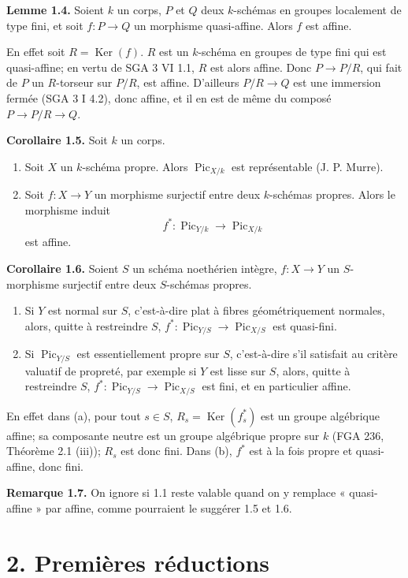 \documentclass[11pt]{article}
\providecommand{\Pic}{\operatorname{Pic}}
\providecommand{\Ker}{\operatorname{Ker}}
\begin{document}
\textbf{Lemme 1.4.} Soient \(k\) un corps, \(P\) et \(Q\) deux \(k\)-schémas en groupes localement de type fini, et soit \(f:P\to Q\) un morphisme quasi-affine. Alors \(f\) est affine.

En effet soit \(R=\Ker(f)\). \(R\) est un \(k\)-schéma en groupes de type fini qui est quasi-affine; en vertu de SGA 3 VI 1.1, \(R\) est alors affine. Donc \(P\to P/R\), qui fait de \(P\) un \(R\)-torseur sur \(P/R\), est affine. D'ailleurs \(P/R\to Q\) est une immersion fermée (SGA 3 I 4.2), donc affine, et il en est de même du composé \(P\to P/R\to Q\).

\textbf{Corollaire 1.5.} Soit \(k\) un corps.
\begin{enumerate}[label=\alph*)]
\item Soit \(X\) un \(k\)-schéma propre. Alors \(\Pic_{X/k}\) est représentable (J. P. Murre).
\item Soit \(f:X\to Y\) un morphisme surjectif entre deux \(k\)-schémas propres. Alors le morphisme induit
\[
  f^*:\Pic_{Y/k}\longrightarrow \Pic_{X/k}
\]
est affine.
\end{enumerate}

\textbf{Corollaire 1.6.} Soient \(S\) un schéma noethérien intègre, \(f:X\to Y\) un \(S\)-morphisme surjectif entre deux \(S\)-schémas propres.
\begin{enumerate}[label=\alph*)]
\item Si \(Y\) est normal sur \(S\), c'est-à-dire plat à fibres géométriquement normales, alors, quitte à restreindre \(S\), \(f^*:\Pic_{Y/S}\to\Pic_{X/S}\) est quasi-fini.
\item Si \(\Pic_{Y/S}\) est essentiellement propre sur \(S\), c'est-à-dire s'il satisfait au critère valuatif de propreté, par exemple si \(Y\) est lisse sur \(S\), alors, quitte à restreindre \(S\), \(f^*:\Pic_{Y/S}\to\Pic_{X/S}\) est fini, et en particulier affine.
\end{enumerate}
En effet dans (a), pour tout \(s\in S\), \(R_s=\Ker(f_s^*)\) est un groupe algébrique affine; sa composante neutre est un groupe algébrique propre sur \(k\) (FGA 236, Théorème 2.1 (iii)); \(R_s\) est donc fini. Dans (b), \(f^*\) est à la fois propre et quasi-affine, donc fini.

\textbf{Remarque 1.7.} On ignore si 1.1 reste valable quand on y remplace « quasi-affine » par affine, comme pourraient le suggérer 1.5 et 1.6.

\section*{2. Premières réductions}
\end{document}
